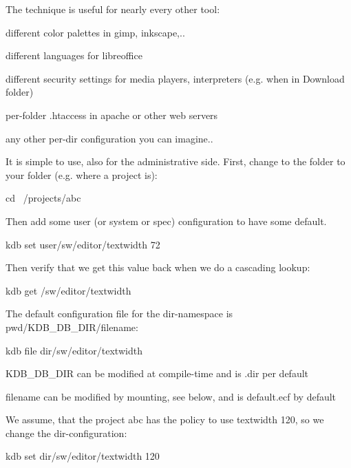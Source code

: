 The technique is useful for nearly every other tool\+:
\begin{DoxyItemize}
\item different color palettes in gimp, inkscape,..
\item different languages for libreoffice
\item different security settings for media players, interpreters (e.\+g. when in Download folder)
\item per-\/folder .htaccess in apache or other web servers
\item any other per-\/dir configuration you can imagine..
\end{DoxyItemize}

It is simple to use, also for the administrative side. First, change to the folder to your folder (e.\+g. where a project is)\+: \begin{DoxyVerb}cd ~/projects/abc
\end{DoxyVerb}


Then add some user (or system or spec) configuration to have some default. \begin{DoxyVerb}kdb set user/sw/editor/textwidth 72
\end{DoxyVerb}


Then verify that we get this value back when we do a cascading lookup\+: \begin{DoxyVerb}kdb get /sw/editor/textwidth
\end{DoxyVerb}


The default configuration file for the dir-\/namespace is {\ttfamily pwd}/\+K\+D\+B\+\_\+\+D\+B\+\_\+\+D\+I\+R/filename\+: \begin{DoxyVerb}kdb file dir/sw/editor/textwidth
\end{DoxyVerb}



\begin{DoxyItemize}
\item K\+D\+B\+\_\+\+D\+B\+\_\+\+D\+I\+R can be modified at compile-\/time and is {\ttfamily .dir} per default
\item filename can be modified by mounting, see below, and is {\ttfamily default.\+ecf} by default
\end{DoxyItemize}

We assume, that the project abc has the policy to use textwidth 120, so we change the dir-\/configuration\+: \begin{DoxyVerb}kdb set dir/sw/editor/textwidth 120
\end{DoxyVerb}



